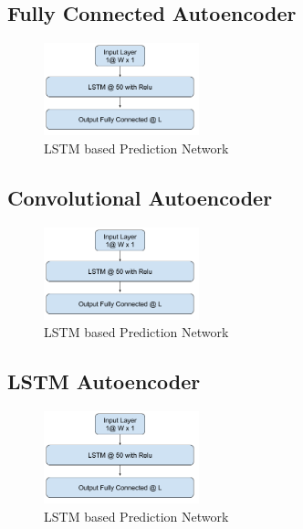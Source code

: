 \documentclass[12pt]{article}
\begin{document}
\subsection{Fully Connected Autoencoder}
\begin{figure}[H]
\centering
        \includegraphics[width=0.4\textwidth]{images/architecture/LstmMultistepaheadPrediction.png}
    \caption{LSTM based Prediction Network}
    \label{generalAnomalyDetectionFrameWork}
\end{figure}

\subsection{Convolutional Autoencoder } 
\begin{figure}[H]
\centering
        \includegraphics[width=0.4\textwidth]{images/architecture/LstmMultistepaheadPrediction.png}
    \caption{LSTM based Prediction Network}
    \label{generalAnomalyDetectionFrameWork}
\end{figure}

\subsection{LSTM Autoencoder }
\begin{figure}[H]
\centering
        \includegraphics[width=0.4\textwidth]{images/architecture/LstmMultistepaheadPrediction.png}
    \caption{LSTM based Prediction Network}
    \label{generalAnomalyDetectionFrameWork}
\end{figure}
\end{document}
